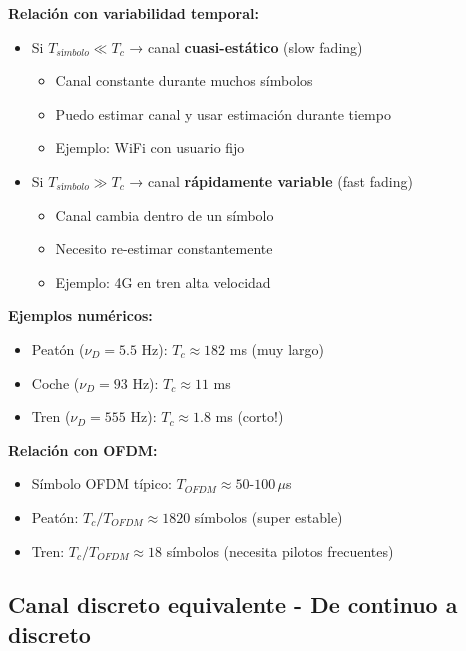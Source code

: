 \documentclass[10pt,a4paper]{article}
\begin{document}
\begin{tcolorbox}[colback=rojoclaro!10,colframe=rojoclaro,title=🚀 Parámetros por MOVILIDAD (Doppler)]
\textbf{Relación con variabilidad temporal:}
\begin{itemize}
\item Si $T_{símbolo} \ll T_c$ → canal \textbf{cuasi-estático} (slow fading)
  \begin{itemize}
  \item Canal constante durante muchos símbolos
  \item Puedo estimar canal y usar estimación durante tiempo
  \item Ejemplo: WiFi con usuario fijo
  \end{itemize}
\item Si $T_{símbolo} \gg T_c$ → canal \textbf{rápidamente variable} (fast fading)
  \begin{itemize}
  \item Canal cambia dentro de un símbolo
  \item Necesito re-estimar constantemente
  \item Ejemplo: 4G en tren alta velocidad
  \end{itemize}
\end{itemize}

\textbf{Ejemplos numéricos:}
\begin{itemize}
\item Peatón ($\nu_D = 5.5$ Hz): $T_c \approx 182$ ms (muy largo)
\item Coche ($\nu_D = 93$ Hz): $T_c \approx 11$ ms
\item Tren ($\nu_D = 555$ Hz): $T_c \approx 1.8$ ms (corto!)
\end{itemize}

\textbf{Relación con OFDM:}
\begin{itemize}
\item Símbolo OFDM típico: $T_{OFDM} \approx 50$-$100\,\mu$s
\item Peatón: $T_c/T_{OFDM} \approx 1820$ símbolos (super estable)
\item Tren: $T_c/T_{OFDM} \approx 18$ símbolos (necesita pilotos frecuentes)
\end{itemize}
\end{tcolorbox}

\subsection{Canal discreto equivalente - De continuo a discreto}
\end{document}
